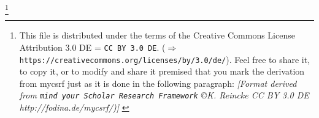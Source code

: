 %
%
%

\footnote{This file is distributed under the terms of the
Creative Commons License Attribution 3.0 DE = \texttt{CC BY 3.0 DE}.
($\Rightarrow$ \texttt{https://creativecommons.org/licenses/by/3.0/de/}).
Feel free to share it, to copy it, or to modify and share it
premised that you mark the derivation from mycsrf just as it
is done in the following paragraph:
\newline 
{ \tiny \itshape [Format derived from \texttt{mind your Scholar Research
Framework} \copyright K. Reincke CC BY 3.0 DE http://fodina.de/mycsrf/)] }}

